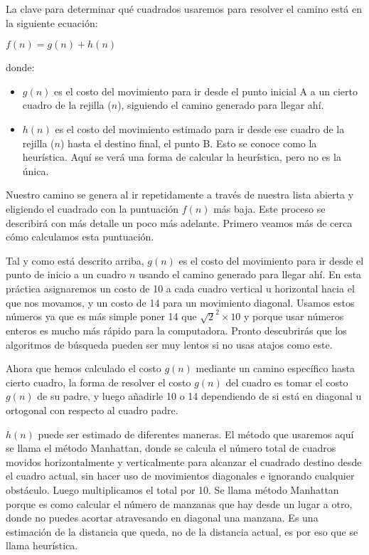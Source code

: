 La clave para determinar qué cuadrados usaremos para resolver el camino está en la siguiente ecuación:\medskip

\begin{center}
\(f(n) = g(n) + h(n)\)
\end{center}\medskip

donde:

\begin{itemize}
  \item \(g(n)\) es el costo del movimiento para ir desde el punto inicial A a un cierto cuadro de la rejilla (\(n\)), siguiendo el camino generado para llegar ahí.
  \item \(h(n)\) es el costo del movimiento estimado para ir desde ese cuadro de la rejilla (\(n\)) hasta el destino final, el punto B. Esto se conoce como la heurística. Aquí se verá una forma de calcular la heurística, pero no es la única.
\end{itemize}

Nuestro camino se genera al ir repetidamente a través de nuestra lista abierta y eligiendo el cuadrado con la puntuación \(f(n)\) más baja. Este proceso se describirá con más detalle un poco más adelante. Primero veamos más de cerca cómo calculamos esta puntuación.

Tal y como está descrito arriba, \(g(n)\) es el costo del movimiento para ir desde el punto de inicio a un cuadro \(n\) usando el camino generado para llegar ahí. En esta práctica asignaremos un costo de 10 a cada cuadro vertical u horizontal hacia el que nos movamos, y un costo de 14 para un movimiento diagonal. Usamos estos números ya que es más simple poner 14 que \(\sqrt{2}^2\times10\) y porque usar números enteros es mucho más rápido para la computadora. Pronto descubrirás que los algoritmos de búsqueda pueden ser muy lentos si no usas atajos como este.

Ahora que hemos calculado el costo \(g(n)\) mediante un camino específico hasta cierto cuadro, la forma de resolver el costo \(g(n)\) del cuadro es tomar el costo \(g(n)\) de su padre, y luego añadirle 10 o 14 dependiendo de si está en diagonal u ortogonal con respecto al cuadro padre.

\(h(n)\) puede ser estimado de diferentes maneras. El método que usaremos aquí se llama el método Manhattan, donde se calcula el número total de cuadros movidos horizontalmente y verticalmente para alcanzar el cuadrado destino desde el cuadro actual, sin hacer uso de movimientos diagonales e ignorando cualquier obstáculo. Luego multiplicamos el total por 10. Se llama método Manhattan porque es como calcular el número de manzanas que hay desde un lugar a otro, donde no puedes acortar atravesando en diagonal una manzana. Es una estimación de la distancia que queda, no de la distancia actual, es por eso que se llama heurística.

